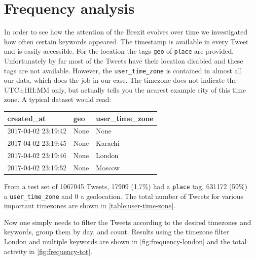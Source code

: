 \documentclass{emulateapj}
\begin{document}
\section{Frequency analysis}\label{sec:frequency-analysis}

In order to see how the attention of the Brexit evolves over time we investigated how often certain keywords appeared.
The timestamp is available in every Tweet and is easily accessible.
For the location the tags \texttt{geo} of \texttt{place} are provided. Unfortunately by far most of the Tweets have their location
disabled and these tags are not available. 
However, the \texttt{user\_time\_zone} is contained in almost all our data, which does the job in our case. 
The timezone does not indicate the UTC$\pm$HH:MM only, but actually tells you the nearest example city of this time zone.
A typical dataset would read:
\newline\newline
{\ttfamily
  \begin{tabular}{|l|l|l|}
    \hline 
    created\_at & geo & user\_time\_zone \\ \hline \hline
    2017-04-02 23:19:42 & None & None \\ \hline
    2017-04-02 23:19:45 & None & Karachi \\ \hline
    2017-04-02 23:19:46 & None & London \\ \hline
    2017-04-02 23:19:52 & None & Moscow \\ \hline
  \end{tabular}
}
\newline\newline
From a test set of 1067045 Tweets, 17909 (1.7\%) had a \texttt{place} tag, 631172 (59\%) a \texttt{user\_time\_zone} and 0 a geolocation.
The total number of Tweets for various important timezones are shown in \ref{table:user-time-zone}.

Now one simply needs to filter the Tweets according to the desired timezones and keywords, group them by day, and count.
Results using the timezone filter London and multiple keywords are shown in \cref{fig:frequency-london} and the total 
activity in \cref{fig:frequency-tot}.
\end{document}
